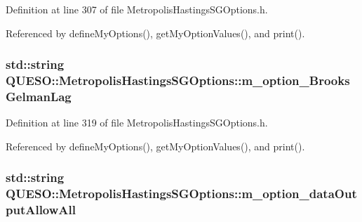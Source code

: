 Definition at line 307 of file Metropolis\-Hastings\-S\-G\-Options.\-h.



Referenced by define\-My\-Options(), get\-My\-Option\-Values(), and print().

\hypertarget{class_q_u_e_s_o_1_1_metropolis_hastings_s_g_options_aba5c080f85571b64975d41498774ab3c}{
\subsubsection[{m\-\_\-option\-\_\-\-Brooks\-Gelman\-Lag}]{\setlength{\rightskip}{0pt plus 5cm}std\-::string Q\-U\-E\-S\-O\-::\-Metropolis\-Hastings\-S\-G\-Options\-::m\-\_\-option\-\_\-\-Brooks\-Gelman\-Lag\hspace{0.3cm}{\ttfamily [private]}}}\label{class_q_u_e_s_o_1_1_metropolis_hastings_s_g_options_aba5c080f85571b64975d41498774ab3c}


Definition at line 319 of file Metropolis\-Hastings\-S\-G\-Options.\-h.



Referenced by define\-My\-Options(), get\-My\-Option\-Values(), and print().

\hypertarget{class_q_u_e_s_o_1_1_metropolis_hastings_s_g_options_a6d1f0f09fa5e238a54c6269c48fc6b29}{
\subsubsection[{m\-\_\-option\-\_\-data\-Output\-Allow\-All}]{\setlength{\rightskip}{0pt plus 5cm}std\-::string Q\-U\-E\-S\-O\-::\-Metropolis\-Hastings\-S\-G\-Options\-::m\-\_\-option\-\_\-data\-Output\-Allow\-All\hspace{0.3cm}{\ttfamily [private]}}}\label{class_q_u_e_s_o_1_1_metropolis_hastings_s_g_options_a6d1f0f09fa5e238a54c6269c48fc6b29}


